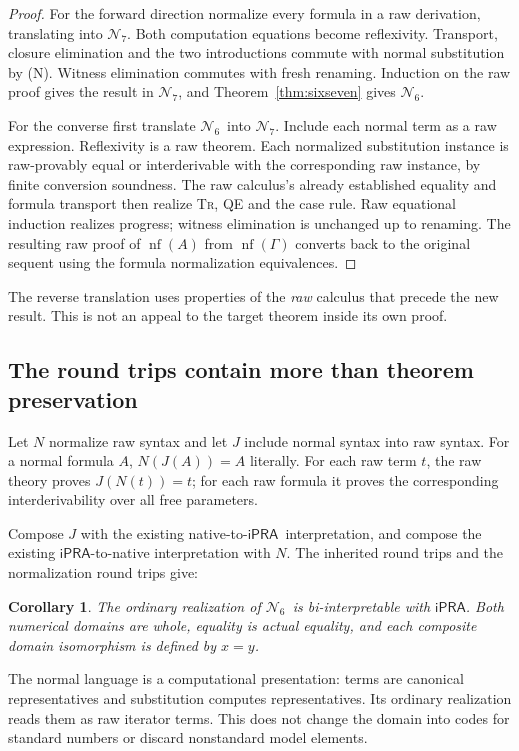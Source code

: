 \documentclass[11pt]{article}
\newtheorem{corollary}[theorem]{Corollary}
\theoremstyle{definition}
\newcommand{\ipra}{\ensuremath{\mathsf{iPRA}}}
\newcommand{\Six}{\ensuremath{\mathcal N_6}}
\newcommand{\Seven}{\ensuremath{\mathcal N_7}}
\newcommand{\nf}[1]{\operatorname{nf}(#1)}
\newcommand{\rulename}[1]{\textup{\textsc{#1}}}
\begin{document}
\begin{proof}
For the forward direction normalize every formula in a raw derivation,
translating into \Seven. Both computation equations become reflexivity.
Transport, closure elimination and the two introductions commute with
normal substitution by (N). Witness elimination commutes with fresh
renaming. Induction on the raw proof gives the result in \Seven,
and Theorem~\ref{thm:sixseven} gives \Six.

For the converse first translate \Six\ into \Seven. Include each
normal term as a raw expression. Reflexivity is a raw theorem.
Each normalized substitution instance is raw-provably equal or
interderivable with the corresponding raw instance, by finite conversion
soundness. The raw calculus's already established equality and formula
transport then realize \rulename{Tr}, \rulename{QE} and the case rule.
Raw equational induction realizes progress; witness elimination is
unchanged up to renaming. The resulting raw proof of $\nf{A}$ from
$\nf{\Gamma}$ converts back to the original sequent using the formula
normalization equivalences.
\end{proof}

The reverse translation uses properties of the \emph{raw} calculus that
precede the new result. This is not an appeal to the target theorem
inside its own proof.

\subsection{The round trips contain more than theorem preservation}

Let $N$ normalize raw syntax and let $J$ include normal syntax into raw
syntax. For a normal formula $A$, $N(J(A))=A$ literally.
For each raw term $t$, the raw theory proves $J(N(t))=t$; for each
raw formula it proves the corresponding interderivability over all
free parameters.

Compose $J$ with the existing native-to-\ipra\ interpretation, and
compose the existing \ipra-to-native interpretation with $N$.
The inherited round trips and the normalization round trips give:

\begin{corollary}
The ordinary realization of \Six\ is bi-interpretable with \ipra.
Both numerical domains are whole, equality is actual equality, and
each composite domain isomorphism is defined by $x=y$.
\end{corollary}

The normal language is a computational presentation: terms are
canonical representatives and substitution computes representatives.
Its ordinary realization reads them as raw iterator terms. This does
not change the domain into codes for standard numbers or discard
nonstandard model elements.
\end{document}
